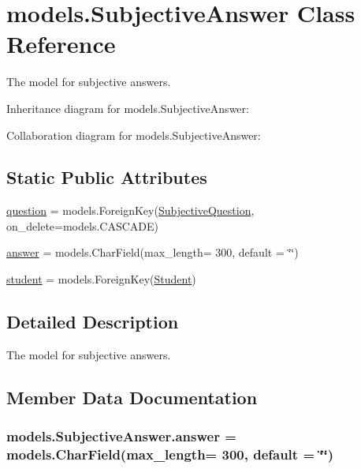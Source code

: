 \hypertarget{classmodels_1_1_subjective_answer}{}\section{models.\+Subjective\+Answer Class Reference}
\label{classmodels_1_1_subjective_answer}


The model for subjective answers.  




Inheritance diagram for models.\+Subjective\+Answer\+:


Collaboration diagram for models.\+Subjective\+Answer\+:
\subsection*{Static Public Attributes}
\begin{DoxyCompactItemize}
\item 
\hyperlink{classmodels_1_1_subjective_answer_af9a597711020be40904098d109899fb9}{question} = models.\+Foreign\+Key(\hyperlink{classmodels_1_1_subjective_question}{Subjective\+Question}, on\+\_\+delete=models.\+C\+A\+S\+C\+A\+DE)
\item 
\hyperlink{classmodels_1_1_subjective_answer_a178078af751d97104d027bab489a92b3}{answer} = models.\+Char\+Field(max\+\_\+length= 300, default = \char`\"{}\char`\"{})
\item 
\hyperlink{classmodels_1_1_subjective_answer_a49878151c4b245be46cccbf3eebd7769}{student} = models.\+Foreign\+Key(\hyperlink{classmodels_1_1_student}{Student})
\end{DoxyCompactItemize}


\subsection{Detailed Description}
The model for subjective answers. 

\subsection{Member Data Documentation}
\subsubsection[{\texorpdfstring{answer}{answer}}]{\setlength{\rightskip}{0pt plus 5cm}models.\+Subjective\+Answer.\+answer = models.\+Char\+Field(max\+\_\+length= 300, default = \char`\"{}\char`\"{})\hspace{0.3cm}{\ttfamily [static]}}\hypertarget{classmodels_1_1_subjective_answer_a178078af751d97104d027bab489a92b3}{}\label{classmodels_1_1_subjective_answer_a178078af751d97104d027bab489a92b3}

